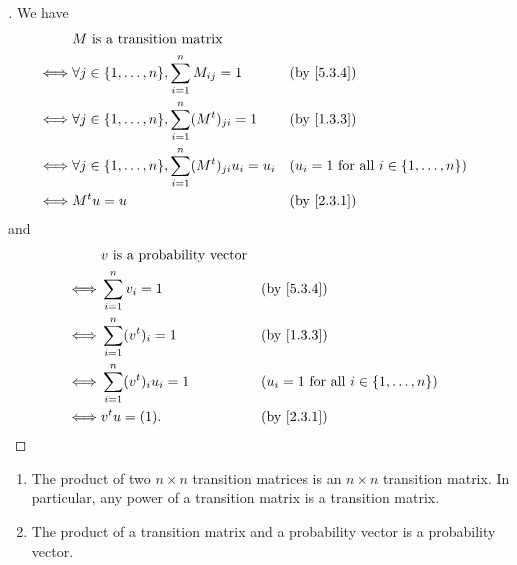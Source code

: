\begin{proof}[]
  We have
  \begin{align*}
         & M \text{ is a transition matrix}                                                                                                 \\
    \iff & \forall j \in \set{1, \dots, n}, \sum_{i = 1}^n M_{i j} = 1              &  & \text{(by \cref{5.3.4})}                           \\
    \iff & \forall j \in \set{1, \dots, n}, \sum_{i = 1}^n (\tp{M})_{j i} = 1       &  & \text{(by \cref{1.3.3})}                           \\
    \iff & \forall j \in \set{1, \dots, n}, \sum_{i = 1}^n (\tp{M})_{j i} u_i = u_i &  & (u_i = 1 \text{ for all } i \in \set{1, \dots, n}) \\
    \iff & \tp{M} u = u                                                             &  & \text{(by \cref{2.3.1})}
  \end{align*}
  and
  \begin{align*}
         & v \text{ is a probability vector}                                                         \\
    \iff & \sum_{i = 1}^n v_i = 1            &  & \text{(by \cref{5.3.4})}                           \\
    \iff & \sum_{i = 1}^n (\tp{v})_i = 1     &  & \text{(by \cref{1.3.3})}                           \\
    \iff & \sum_{i = 1}^n (\tp{v})_i u_i = 1 &  & (u_i = 1 \text{ for all } i \in \set{1, \dots, n}) \\
    \iff & \tp{v} u = (1).                   &  & \text{(by \cref{2.3.1})}
  \end{align*}
\end{proof}

\begin{cor}\label{5.3.5}
  \begin{enumerate}
    \item The product of two \(n \times n\) transition matrices is an \(n \times n\) transition matrix.
          In particular, any power of a transition matrix is a transition matrix.
    \item The product of a transition matrix and a probability vector is a probability vector.
  \end{enumerate}
\end{cor}

